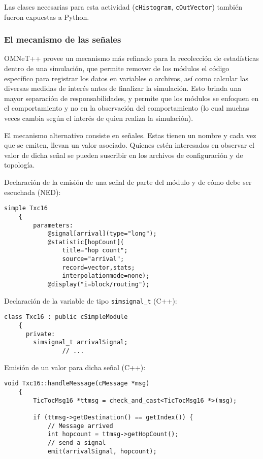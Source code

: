 \documentclass[]{article}
\begin{document}
Las clases necesarias para esta actividad (\verb!cHistogram!,
\verb!cOutVector!) también fueron expuestas a Python.

\subsubsection{El mecanismo de las señales}

OMNeT++ provee un mecanismo más refinado para la recolección de estadísticas
dentro de una simulación, que permite remover de los módulos el código
específico para registrar los datos en variables o archivos, así como calcular
las diversas medidas de interés antes de finalizar la simulación. Esto brinda
una mayor separación de responsabilidades, y permite que los módulos se
enfoquen en el comportamiento y no en la observación del comportamiento (lo
cual muchas veces cambia según el interés de quien realiza la simulación).

El mecanismo alternativo consiste en señales. Estas tienen un nombre y cada vez
que se emiten, llevan un valor asociado. Quienes estén interesados en observar
el valor de dicha señal se pueden suscribir en los archivos de configuración y
de topología.

Declaración de la emisión de una señal de parte del módulo y de cómo debe ser
escuchada (NED):

\begin{verbatim}
simple Txc16
    {
        parameters:
            @signal[arrival](type="long");
            @statistic[hopCount](
                title="hop count";
                source="arrival";
                record=vector,stats;
                interpolationmode=none);
            @display("i=block/routing");
\end{verbatim}

Declaración de la variable de tipo \verb!simsignal_t! (C++):

\begin{verbatim}
class Txc16 : public cSimpleModule
    {
      private:
        simsignal_t arrivalSignal;
                // ...
\end{verbatim}

Emisión de un valor para dicha señal (C++):

\begin{verbatim}
void Txc16::handleMessage(cMessage *msg)
    {
        TicTocMsg16 *ttmsg = check_and_cast<TicTocMsg16 *>(msg);
    
        if (ttmsg->getDestination() == getIndex()) {
            // Message arrived
            int hopcount = ttmsg->getHopCount();
            // send a signal
            emit(arrivalSignal, hopcount);
\end{verbatim}
\end{document}
